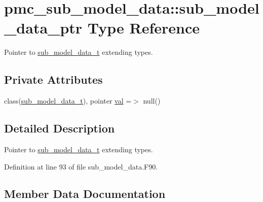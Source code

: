 \hypertarget{structpmc__sub__model__data_1_1sub__model__data__ptr}{}\section{pmc\+\_\+sub\+\_\+model\+\_\+data\+:\+:sub\+\_\+model\+\_\+data\+\_\+ptr Type Reference}
\label{structpmc__sub__model__data_1_1sub__model__data__ptr}


Pointer to \mbox{\hyperlink{structpmc__sub__model__data_1_1sub__model__data__t}{sub\+\_\+model\+\_\+data\+\_\+t}} extending types.  


\subsection*{Private Attributes}
\begin{DoxyCompactItemize}
\item 
class(\mbox{\hyperlink{structpmc__sub__model__data_1_1sub__model__data__t}{sub\+\_\+model\+\_\+data\+\_\+t}}), pointer \mbox{\hyperlink{structpmc__sub__model__data_1_1sub__model__data__ptr_a3b73061550820ec2b3ed782e402bf31d}{val}} =$>$ null()
\end{DoxyCompactItemize}


\subsection{Detailed Description}
Pointer to \mbox{\hyperlink{structpmc__sub__model__data_1_1sub__model__data__t}{sub\+\_\+model\+\_\+data\+\_\+t}} extending types. 

Definition at line 93 of file sub\+\_\+model\+\_\+data.\+F90.



\subsection{Member Data Documentation}
\mbox{\label{structpmc__sub__model__data_1_1sub__model__data__ptr_a3b73061550820ec2b3ed782e402bf31d}} 
